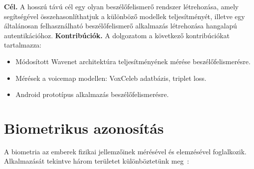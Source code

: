 \newline
\newline
\textbf{Cél.} A hosszú távú cél egy olyan beszélőfelismerő rendszer létrehozása, amely segítségével összehasonlíthatjuk a különböző modellek teljesítményét, illetve egy általánosan felhasználható beszélőfelismerő alkalmazás létrehozása hangalapú autentikációhoz.
\newline
\newline
\textbf{Kontribúciók.} A dolgozatom a következő kontribúciókat tartalmazza:
\begin{itemize}
	\item Módosított Wavenet architektúra teljesítményének mérése beszélőfelismerésre.
	\item Mérések a voicemap modellen: VoxCeleb adatbázis, triplet loss.
	\item Android prototípus alkalmazás beszélőfelismerésre.
\end{itemize} 


\section{Biometrikus azonosítás}

A biometria az emberek fizikai jellemzőinek mérésével és elemzésével foglalkozik. Alkalmazását tekintve három területet különböztetünk meg~\cite{gemalto_2019}:

